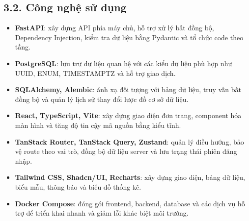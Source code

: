 \documentclass[13pt,a4paper]{extarticle}
\begin{document}
	\subsection*{3.2. Công nghệ sử dụng}
	\begin{itemize}
		\item \textbf{FastAPI}: xây dựng API phía máy chủ, hỗ trợ xử lý bất đồng bộ, Dependency Injection, kiểm tra dữ liệu bằng Pydantic và tổ chức code theo tầng.
		\item \textbf{PostgreSQL}: lưu trữ dữ liệu quan hệ với các kiểu dữ liệu phù hợp như UUID, ENUM, TIMESTAMPTZ và hỗ trợ giao dịch.
		\item \textbf{SQLAlchemy, Alembic}: ánh xạ đối tượng với bảng dữ liệu, truy vấn bất đồng bộ và quản lý lịch sử thay đổi lược đồ cơ sở dữ liệu.
		\item \textbf{React, TypeScript, Vite}: xây dựng giao diện đơn trang, component hóa màn hình và tăng độ tin cậy mã nguồn bằng kiểu tĩnh.
		\item \textbf{TanStack Router, TanStack Query, Zustand}: quản lý điều hướng, bảo vệ route theo vai trò, đồng bộ dữ liệu server và lưu trạng thái phiên đăng nhập.
		\item \textbf{Tailwind CSS, Shadcn/UI, Recharts}: xây dựng giao diện, bảng dữ liệu, biểu mẫu, thông báo và biểu đồ thống kê.
		\item \textbf{Docker Compose}: đóng gói frontend, backend, database và các dịch vụ hỗ trợ để triển khai nhanh và giảm lỗi khác biệt môi trường.
	\end{itemize}
	
\end{document}
